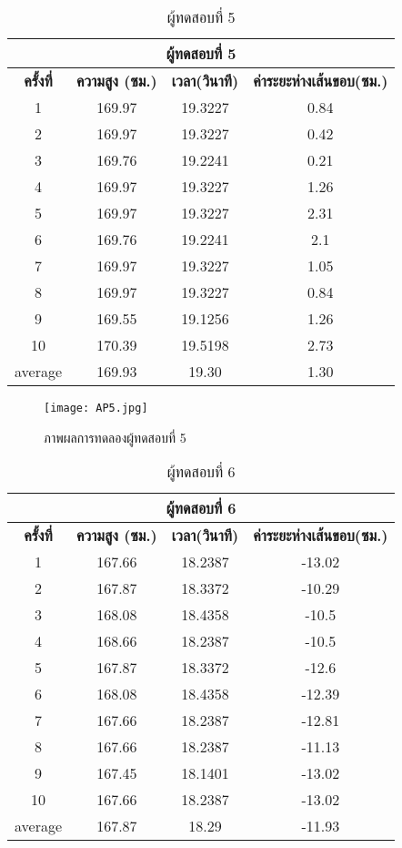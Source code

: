 \begin{table}[!hb] 
\centering
\caption{ผู้ทดสอบที่ 5}
\label{tab:5}
\begin{tabular}{|c|c|c|c|}
\hline
\multicolumn{4}{|c|}{\textbf{ผู้ทดสอบที่ 5}}    \\ \hline
\textbf{ครั้งที่} & \textbf{ความสูง (ซม.)} & \textbf{เวลา(วินาที)} & \textbf{ค่าระยะห่างเส้นขอบ(ซม.)}  \\ \hline
1       & 169.97 & 19.3227 & 0.84   \\ \hline
2       & 169.97 & 19.3227 & 0.42     \\ \hline
3       & 169.76 & 19.2241 & 0.21      \\ \hline
4       & 169.97 & 19.3227 & 1.26    \\ \hline
5       & 169.97 & 19.3227 & 2.31      \\ \hline
6       & 169.76 & 19.2241 & 2.1    \\ \hline
7       & 169.97 & 19.3227 & 1.05    \\ \hline
8       & 169.97 & 19.3227 & 0.84  \\ \hline
9       & 169.55 & 19.1256 & 1.26   \\ \hline
10      & 170.39 & 19.5198 & 2.73   \\ \hline
average & 169.93 & 19.30   & 1.30   \\ \hline
\end{tabular}
\end{table}

\begin{figure}[!ht]
\centering
\texttt{[image: AP5.jpg]}
\caption{ภาพผลการทดลองผู้ทดสอบที่ 5 }
\label{fig:AP5.jpg}
\end{figure}


\begin{table}[!hb] 
\centering
\caption{ผู้ทดสอบที่ 6}
\label{tab:6}
\begin{tabular}{|c|c|c|c|}
\hline
\multicolumn{4}{|c|}{\textbf{ผู้ทดสอบที่ 6}}    \\ \hline
\textbf{ครั้งที่} & \textbf{ความสูง (ซม.)} & \textbf{เวลา(วินาที)} & \textbf{ค่าระยะห่างเส้นขอบ(ซม.)} \\ \hline
1       & 167.66 & 18.2387 & -13.02    \\ \hline
2       & 167.87 & 18.3372 & -10.29    \\ \hline
3       & 168.08 & 18.4358 & -10.5   \\ \hline
4       & 168.66 & 18.2387 & -10.5    \\ \hline
5       & 167.87 & 18.3372 & -12.6     \\ \hline
6       & 168.08 & 18.4358 & -12.39   \\ \hline
7       & 167.66 & 18.2387 & -12.81\\ \hline
8       & 167.66 & 18.2387 & -11.13  \\ \hline
9       & 167.45 & 18.1401 & -13.02  \\ \hline
10      & 167.66 & 18.2387 & -13.02  \\ \hline
average & 167.87 & 18.29   & -11.93   \\ \hline
\end{tabular}
\end{table}

